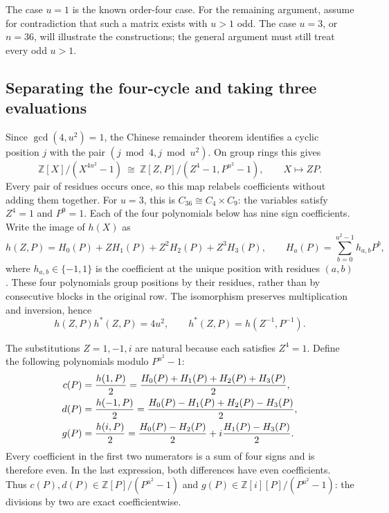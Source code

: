 \documentclass[11pt]{article}
\begin{document}
The case $u=1$ is the known order-four case. For the remaining argument,
assume for contradiction that such a matrix exists with $u>1$ odd.
The case $u=3$, or $n=36$, will illustrate the constructions; the general
argument must still treat every odd $u>1$.

\subsection{Separating the four-cycle and taking three evaluations}%
\label{sec:proof-three-evaluations}

Since $\gcd(4,u^{2})=1$, the Chinese remainder theorem identifies a cyclic
position $j$ with the pair $(j\bmod4,j\bmod u^{2})$. On group rings this gives
\[
  \mathbb Z[X]/(X^{4u^{2}}-1)
  \ \cong\
  \mathbb Z[Z,P]/(Z^{4}-1,P^{u^{2}}-1),
  \qquad X\longmapsto ZP.
\]
Every pair of residues occurs once, so this map relabels coefficients
without adding them together. For $u=3$, this is $C_{36}\cong C_4\times C_9$:
the variables satisfy $Z^4=1$ and $P^9=1$. Each of the four polynomials
below has nine sign coefficients. Write the image of $h(X)$ as
\begin{equation}
  h(Z,P)=H_{0}(P)+ZH_{1}(P)+Z^{2}H_{2}(P)+Z^{3}H_{3}(P),
  \qquad
  H_{a}(P)=\sum_{b=0}^{u^{2}-1}h_{a,b}P^{b},%
  \label{eq:early-four-sign-polynomials}
\end{equation}
where $h_{a,b}\in\{-1,1\}$ is the coefficient at the unique position
with residues $(a,b)$. These four polynomials group positions by their
residues, rather than by consecutive blocks in the original row.
The isomorphism preserves multiplication and inversion, hence
\[
  h(Z,P)h^{*}(Z,P)=4u^{2},
  \qquad h^{*}(Z,P)=h(Z^{-1},P^{-1}).
\]

The substitutions $Z=1,-1,i$ are natural because each satisfies $Z^{4}=1$.
Define the following polynomials modulo $P^{u^{2}}-1$:
\begin{align}
  c(P)&=\frac{h(1,P)}2
       =\frac{H_{0}(P)+H_{1}(P)+H_{2}(P)+H_{3}(P)}2,\notag\\
  d(P)&=\frac{h(-1,P)}2
       =\frac{H_{0}(P)-H_{1}(P)+H_{2}(P)-H_{3}(P)}2,\notag\\
  g(P)&=\frac{h(i,P)}2
       =\frac{H_{0}(P)-H_{2}(P)}2
          +i\frac{H_{1}(P)-H_{3}(P)}2.%
  \label{eq:early-three-evaluations}
\end{align}
Every coefficient in the first two numerators is a sum of four signs and
is therefore even. In the last expression, both differences have even
coefficients. Thus $c(P),d(P)\in\mathbb Z[P]/(P^{u^{2}}-1)$ and
$g(P)\in\mathbb Z[i][P]/(P^{u^{2}}-1)$: the divisions by two are exact
coefficientwise.
\end{document}

